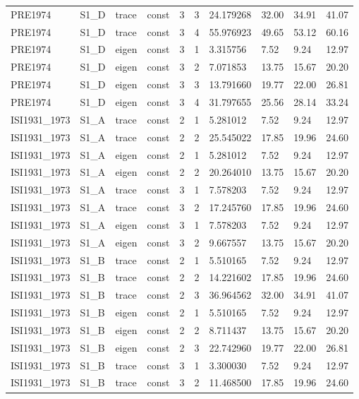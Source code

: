 \begin{tabular}{llllllllll}
PRE1974 & S1\_D & trace & const & 3 & 3 & 24.179268 & 32.00 & 34.91 & 41.07 \\
PRE1974 & S1\_D & trace & const & 3 & 4 & 55.976923 & 49.65 & 53.12 & 60.16 \\
PRE1974 & S1\_D & eigen & const & 3 & 1 & 3.315756 & 7.52 & 9.24 & 12.97 \\
PRE1974 & S1\_D & eigen & const & 3 & 2 & 7.071853 & 13.75 & 15.67 & 20.20 \\
PRE1974 & S1\_D & eigen & const & 3 & 3 & 13.791660 & 19.77 & 22.00 & 26.81 \\
PRE1974 & S1\_D & eigen & const & 3 & 4 & 31.797655 & 25.56 & 28.14 & 33.24 \\
ISI1931\_1973 & S1\_A & trace & const & 2 & 1 & 5.281012 & 7.52 & 9.24 & 12.97 \\
ISI1931\_1973 & S1\_A & trace & const & 2 & 2 & 25.545022 & 17.85 & 19.96 & 24.60 \\
ISI1931\_1973 & S1\_A & eigen & const & 2 & 1 & 5.281012 & 7.52 & 9.24 & 12.97 \\
ISI1931\_1973 & S1\_A & eigen & const & 2 & 2 & 20.264010 & 13.75 & 15.67 & 20.20 \\
ISI1931\_1973 & S1\_A & trace & const & 3 & 1 & 7.578203 & 7.52 & 9.24 & 12.97 \\
ISI1931\_1973 & S1\_A & trace & const & 3 & 2 & 17.245760 & 17.85 & 19.96 & 24.60 \\
ISI1931\_1973 & S1\_A & eigen & const & 3 & 1 & 7.578203 & 7.52 & 9.24 & 12.97 \\
ISI1931\_1973 & S1\_A & eigen & const & 3 & 2 & 9.667557 & 13.75 & 15.67 & 20.20 \\
ISI1931\_1973 & S1\_B & trace & const & 2 & 1 & 5.510165 & 7.52 & 9.24 & 12.97 \\
ISI1931\_1973 & S1\_B & trace & const & 2 & 2 & 14.221602 & 17.85 & 19.96 & 24.60 \\
ISI1931\_1973 & S1\_B & trace & const & 2 & 3 & 36.964562 & 32.00 & 34.91 & 41.07 \\
ISI1931\_1973 & S1\_B & eigen & const & 2 & 1 & 5.510165 & 7.52 & 9.24 & 12.97 \\
ISI1931\_1973 & S1\_B & eigen & const & 2 & 2 & 8.711437 & 13.75 & 15.67 & 20.20 \\
ISI1931\_1973 & S1\_B & eigen & const & 2 & 3 & 22.742960 & 19.77 & 22.00 & 26.81 \\
ISI1931\_1973 & S1\_B & trace & const & 3 & 1 & 3.300030 & 7.52 & 9.24 & 12.97 \\
ISI1931\_1973 & S1\_B & trace & const & 3 & 2 & 11.468500 & 17.85 & 19.96 & 24.60 \\

\end{tabular}
